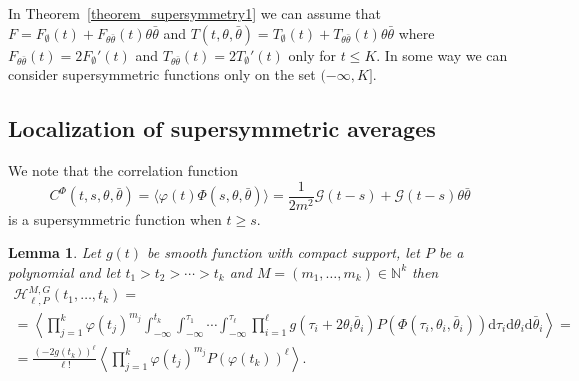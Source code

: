 \documentclass[a4paper,10pt]{article}
\newcommand{\mathd}{\mathrm{d}}
\newtheorem{lemma}[theorem]{Lemma}
{\theorembodyfont{\rmfamily}\newtheorem{remark}[theorem]{Remark}}
\begin{document}
\begin{remark}
  \label{remark_supersymmetry}In Theorem~\ref{theorem_supersymmetry1} we can
  assume that $F = F_{\emptyset} (t) + F_{\theta \bar{\theta}} (t) \theta
  \bar{\theta}$ and $T (t, \theta, \bar{\theta}) = T_{\emptyset} (t) +
  T_{\theta \bar{\theta}} (t) \theta \bar{\theta}$ where $F_{\theta
  \bar{\theta}} (t) = 2 F_{\emptyset}' (t)$ and $T_{\theta \bar{\theta}} (t) =
  2 T_{\emptyset}' (t)$ only for $t \leqslant K$. In some way we can consider
  supersymmetric functions only on the set $(- \infty, K]$. 
\end{remark}

\subsection{Localization of supersymmetric averages}

\begin{remark}
  \label{remark_supersymmetry2}We note that the correlation function
  \[ C^{\Phi} (t, s, \theta, \bar{\theta}) = \langle \varphi (t) \Phi (s,
     \theta, \bar{\theta}) \rangle = \frac{1}{2 m^2} \mathcal{G} (t - s) +
     \mathcal{G} (t - s) \theta \bar{\theta} \]
  is a supersymmetric function when $t \geqslant s$.
\end{remark}

\begin{lemma}
  \label{lemma_superprobability}Let $g (t)$ be smooth function with compact
  support, let $P$ be a polynomial and let $t_1 > t_2 > \cdots > t_k$ and $M =
  (m_1, \ldots, m_k) \in \mathbb{N}^k$ then
 \begin{multline*} \mathcal{H}_{\ell, P}^{M, G} (t_1, \ldots, t_k) =
\\ =\left\langle \prod_{j
     = 1}^k \varphi (t_j)^{m_j} \int_{- \infty}^{t_k} \int_{- \infty}^{\tau_1}
     \cdots \int_{- \infty}^{\tau_{\ell}} \prod_{i = 1}^{\ell} g \left( \tau_i
     + 2 \theta_i \bar{\theta}_i \right) P (\Phi (\tau_i, \theta_i,
     \bar{\theta}_i)) \mathd \tau_i \mathd \theta_i \mathd \bar{\theta}_i
     \right\rangle = \\
   = \frac{(- 2 g (t_k))^{\ell}}{\ell !} \left\langle \prod_{j = 1}^k
     \varphi (t_j)^{m_j} P (\varphi (t_k))^{\ell} \right\rangle . 
\end{multline*}
\end{lemma}
\end{document}

